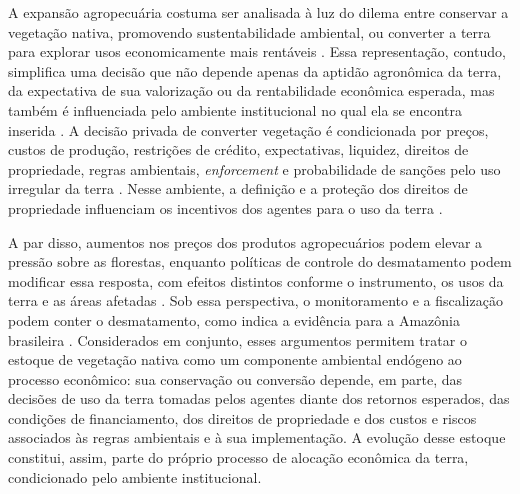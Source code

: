 A expansão agropecuária costuma ser analisada à luz do dilema entre conservar a vegetação nativa, promovendo sustentabilidade ambiental, ou converter a terra para explorar usos economicamente mais rentáveis \cite{Angelsen2010}. Essa representação, contudo, simplifica uma decisão que não depende apenas da aptidão agronômica da terra, da expectativa de sua valorização ou da rentabilidade econômica esperada, mas também é influenciada pelo ambiente institucional no qual ela se encontra inserida \cite{LubowskiEtAl2008}. A decisão privada de converter vegetação é condicionada por preços, custos de produção, restrições de crédito, expectativas, liquidez, direitos de propriedade, regras ambientais, \textit{enforcement} e probabilidade de sanções pelo uso irregular da terra \cite{JungEtAl2022}. Nesse ambiente, a definição e a proteção dos direitos de propriedade influenciam os incentivos dos agentes para o uso da terra \cite{alstonTitlesConflictLand1999}. 

A par disso, aumentos nos preços dos produtos agropecuários podem elevar a pressão sobre as florestas, enquanto políticas de controle do desmatamento podem modificar essa resposta, com efeitos distintos conforme o instrumento, os usos da terra e as áreas afetadas \cite{HardingEtAl2021}. Sob essa perspectiva, o monitoramento e a fiscalização podem conter o desmatamento, como indica a evidência para a Amazônia brasileira \cite{AssuncaoEtAl2023}. Considerados em conjunto, esses argumentos permitem tratar o estoque de vegetação nativa como um componente ambiental endógeno ao processo econômico: sua conservação ou conversão depende, em parte, das decisões de uso da terra tomadas pelos agentes diante dos retornos esperados, das condições de financiamento, dos direitos de propriedade e dos custos e riscos associados às regras ambientais e à sua implementação. A evolução desse estoque constitui, assim, parte do próprio processo de alocação econômica da terra, condicionado pelo ambiente institucional. %

